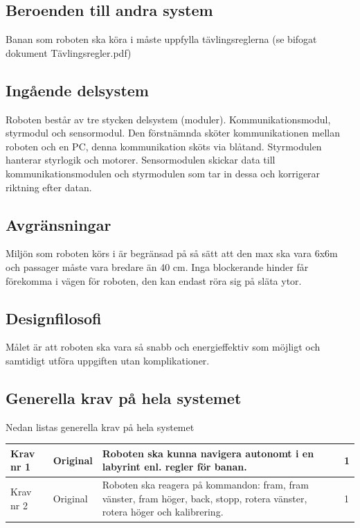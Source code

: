 \documentclass[11pt]{article}
\begin{document}
\begin{flushleft}
\subsection{Beroenden till andra system}
Banan som roboten ska köra i måste uppfylla tävlingsreglerna (se bifogat dokument Tävlingsregler.pdf)

\subsection{Ingående delsystem}
Roboten består av tre stycken delsystem (moduler). Kommunikationsmodul, styrmodul och sensormodul. Den förstnämnda sköter kommunikationen mellan roboten och en PC, denna kommunikation sköts via blåtand. Styrmodulen hanterar styrlogik och motorer. Sensormodulen skickar data till kommunikationsmodulen och styrmodulen som tar in dessa och korrigerar riktning efter datan.

\subsection{Avgränsningar}
Miljön som roboten körs i är begränsad på så sätt att den max ska vara 6x6m och passager måste vara bredare än 40 cm. Inga blockerande hinder får förekomma i vägen för roboten, den kan endast röra sig på släta ytor.

\subsection{Designfilosofi}
Målet är att roboten ska vara så snabb och energieffektiv som möjligt och samtidigt utföra uppgiften utan komplikationer. 

\pagebreak

\subsection{Generella krav på hela systemet}
Nedan listas generella krav på hela systemet
\\
\begin{center}
\begin{longtable}{|l|l|p{.70\linewidth}|l|} \hline

Krav nr 1 & 
Original & 
Roboten ska kunna navigera autonomt i en labyrint enl. regler för banan. & 
1 \\ \hline

Krav nr 2 & 
Original & 
Roboten ska reagera på kommandon: fram, fram vänster, fram höger, back, stopp, rotera vänster, rotera höger och kalibrering. & 
1 \\ \hline


\end{longtable}
\end{center}
\end{flushleft}
\end{document}
